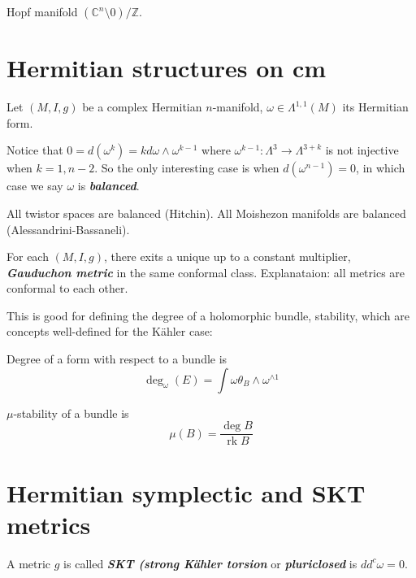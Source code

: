 \begin{example}
	Hopf manifold $(\mathbb{C}^n\setminus 0)/\mathbb{Z}$.
\end{example}

\section{Hermitian structures on cm}
Let $(M,I,g)$ be a complex Hermitian $n$-manifold, $\omega\in\Lambda^{1,1}(M)$ its Hermitian form.

\begin{remark}
	Notice that $0=d(\omega^k)=kd\omega\wedge \omega^{k-1}$ where $\omega^{k-1}:\Lambda^3\to \Lambda^{3+k}$ is not injective when $k=1,n-2$. So the only interesting case is when $d(\omega^{n-1})=0$, in which case we say $\omega$ is \textit{\textbf{balanced}}.

	All twistor spaces are balanced (Hitchin). All Moishezon manifolds are balanced (Alessandrini-Bassaneli).
\end{remark}


\begin{thm}[Gauduchon]\leavevmode
	For each $(M,I,g)$, there exits a unique up to a constant multiplier, \textit{\textbf{Gauduchon metric}} in the same conformal class. Explanataion: all metrics are conformal to each other.
\end{thm}

This is good for defining the degree of a holomorphic bundle, stability, which are concepts well-defined for the K\"ahler case:

\begin{defn}
	Degree of a form with respect to a bundle is
	\[\operatorname{deg}_\omega(E)=\int \omega\theta_B\wedge \omega^{\wedge 1}\]
\end{defn}

\begin{defn}
	$\mu$-stability of a bundle is
	\[\mu(B)=\frac{\operatorname{deg}B}{\operatorname{rk}B}\]
\end{defn}

\section{Hermitian symplectic and SKT metrics}

\begin{defn}
	A metric $g$ is called  \textit{\textbf{SKT (strong K\"ahler torsion}} or \textit{\textbf{pluriclosed}} is $dd^c\omega=0$.
\end{defn}

